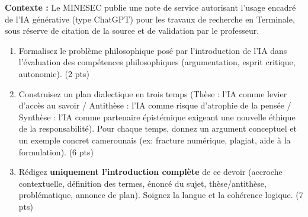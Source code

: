 \documentclass[11pt]{article}
\begin{document}
\begin{exercice}
\textbf{Contexte :} Le MINESEC publie une note de service autorisant l'usage encadré de l'IA générative (type ChatGPT) pour les travaux de recherche en Terminale, sous réserve de citation de la source et de validation par le professeur.

\begin{enumerate}
    \item Formalisez le problème philosophique posé par l'introduction de l'IA dans l'évaluation des compétences philosophiques (argumentation, esprit critique, autonomie). (2 pts)
    \item Construisez un plan dialectique en trois temps (Thèse : l'IA comme levier d'accès au savoir / Antithèse : l'IA comme risque d'atrophie de la pensée / Synthèse : l'IA comme partenaire épistémique exigeant une nouvelle éthique de la responsabilité). Pour chaque temps, donnez un argument conceptuel et un exemple concret camerounais (ex: fracture numérique, plagiat, aide à la formulation). (6 pts)
    \item Rédigez \textbf{uniquement l'introduction complète} de ce devoir (accroche contextuelle, définition des termes, énoncé du sujet, thèse/antithèse, problématique, annonce de plan). Soignez la langue et la cohérence logique. (7 pts)
\end{enumerate}
\end{exercice}
\end{document}
